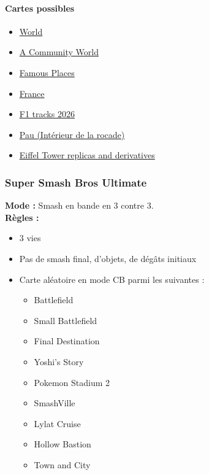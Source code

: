 \documentclass[11pt,a4paper]{article}
\begin{document}
    \paragraph{Cartes possibles}
    \begin{itemize}
        \item \href{https://www.geoguessr.com/fr/maps/world}{World}
        \item \href{https://www.geoguessr.com/fr/maps/62a44b22040f04bd36e8a914}{A Community World}
        \item \href{https://www.geoguessr.com/fr/maps/famous-places}{Famous Places}
        \item \href{https://www.geoguessr.com/fr/maps/france}{France}
        \item \href{https://www.geoguessr.com/fr/maps/64edb149ef5a06cfe58bf922}{F1 tracks 2026}
        \item \href{https://www.geoguessr.com/fr/maps/6554fb70c974b236f72cd734}{Pau (Intérieur de la rocade)}
        \item \href{https://www.geoguessr.com/fr/maps/60451069abd02500012138c9}{Eiffel Tower replicas and derivatives}
    \end{itemize}

    \subsubsection{Super Smash Bros Ultimate}
    \textbf{Mode :} Smash en bande en 3 contre 3.\\
    \textbf{Règles :}
    \begin{itemize}
        \item 3 vies
        \item Pas de smash final, d'objets, de dégâts initiaux
        \item Carte aléatoire en mode CB parmi les suivantes :
        \begin{itemize}
            \item Battlefield
            \item Small Battlefield
            \item Final Destination
            \item Yoshi's Story
            \item Pokemon Stadium 2
            \item SmashVille
            \item Lylat Cruise
            \item Hollow Bastion
            \item Town and City
        \end{itemize}
    \end{itemize}
\end{document}
